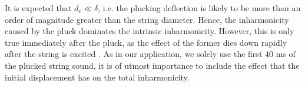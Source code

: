 \documentclass{article}
\begin{document}
\begin{sloppy}
% 
% 
% 
% 
% 
%
It is expected that $d_\text{c}\ll\delta$, i.e. the plucking deflection is likely to be more than an order of magnitude greater than the string diameter. Hence, the inharmonicity caused by the pluck dominates the intrinsic inharmonicity. However, this is only true immediately after the pluck, as the effect of the former dies down rapidly after the string is excited \cite{rossing:science_of_string_instruments}. %
As in our application, we solely use the first 40 ms of the plucked string sound, it is of utmost importance to include the effect that the initial displacement has on the total inharmonicity.
%
%

\end{sloppy}
\end{document}
